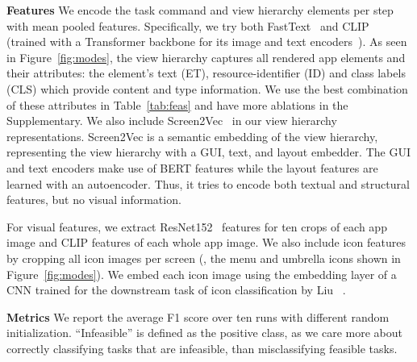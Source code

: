 \noindent\textbf{Features}
We encode the task command and view hierarchy elements per step with mean pooled features. Specifically, we try both FastText~\cite{bojanowski-etal-2017-enriching} and CLIP~\cite{clip} (trained with a Transformer backbone for its image and text encoders~\cite{dosovitskiy2021image,transformer}). 
As seen in Figure~\ref{fig:modes}, the view hierarchy captures all rendered app elements and their attributes: the element's text (ET), resource-identifier (ID) and class labels (CLS) which provide content and type information. We use the best combination of these attributes in Table~\ref{tab:feas} and have more ablations in the Supplementary. We also include Screen2Vec~\cite{screen2vec} in our view hierarchy representations. Screen2Vec is a semantic embedding of the view hierarchy, representing the view hierarchy with a GUI, text, and layout embedder. The GUI and text encoders make use of BERT features while the layout features are learned with an autoencoder. Thus, it tries to encode both textual and structural features, but no visual information.

For visual features, we extract ResNet152~\cite{resnet} features for ten crops of each app image and CLIP features of each whole app image. We also include icon features by cropping all icon images per screen (\eg, the menu and umbrella icons shown in Figure~\ref{fig:modes}). We embed each icon image using the embedding layer of a CNN trained for the downstream task of icon classification by Liu \etal~\cite{designsemantics}.
\smallskip

\noindent\textbf{Metrics}
We report the average F1 score over ten runs with different random initialization. ``Infeasible'' is defined as the positive class, as we care more about correctly classifying tasks that are infeasible, than misclassifying feasible tasks.

